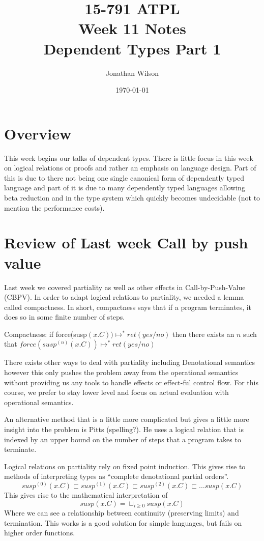 \documentclass[11pt]{article}
\title{15-791 ATPL \\ Week 11 Notes \\ Dependent Types Part 1}
\author{Jonathan Wilson}
\date{\today}
\begin{document}
\maketitle{}

\section*{Overview}

This week begins our talks of dependent types. There is little focus in this week on logical relations or proofs and rather an emphasis on language design. Part of this is due to there not being one single canonical form of dependently typed language and part of it is due to many dependently typed languages allowing beta reduction and in the type system which quickly becomes undecidable (not to mention the performance costs).

\section*{Review of Last week Call by push value}

Last week we covered partiality as well as other effects in Call-by-Push-Value (CBPV). In order to adapt logical relations to partiality, we needed a lemma called compactness. In short, compactness says that if a program terminates, it does so in some finite number of steps.

Compactness: if force(susp$(x.C)) \mapsto^* ret(yes / no)$ then there exists an $n$ such that $force(susp^{(n)}(x.C)) \mapsto^* ret(yes / no)$

There exists other ways to deal with partiality including Denotational semantics however this only pushes the problem away from the operational semantics without providing us any tools to handle effects or effect-ful control flow. For this course, we prefer to stay lower level and focus on actual evaluation with operational semantics.

An alternative method that is a little more complicated but gives a little more insight into the problem is Pitts (spelling?). He uses a logical relation that is indexed by an upper bound on the number of steps that a program takes to terminate.

Logical relations on partiality rely on fixed point induction. This gives rise to methods of interpreting types as ``complete denotational partial orders''.
$$susp^{(0)}(x.C) \sqsubset susp^{(1)}(x.C) \sqsubset susp^{(2)}(x.C) \sqsubset \dots susp(x.C)$$
This gives rise to the mathematical interpretation of
$$susp(x.C) = \sqcup_{i \ge 0} susp(x.C)$$
Where we can see a relationship between continuity (preserving limits) and termination. This works is a good solution for simple languages, but fails on higher order functions.
\end{document}
